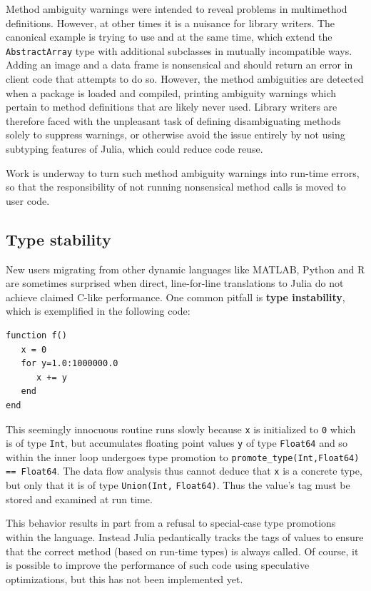 \documentclass[10pt, preprint]{sigplanconf}
\begin{document}
Method ambiguity warnings were intended to reveal problems in multimethod
definitions. However, at other times it is a nuisance for library
writers. The canonical example is trying to use  and
 at the same time, which extend the \verb|AbstractArray|
type with additional subclasses in mutually incompatible ways. Adding an image
and a data frame is nonsensical and should return an error in client code that
attempts to do so. However, the method ambiguities are detected when a package
is loaded and compiled, printing ambiguity warnings which pertain to method
definitions that are likely never used.
Library writers are therefore faced with the unpleasant task of defining
disambiguating methods solely to suppress warnings, or otherwise
avoid the issue entirely by not using subtyping features of Julia, which could
reduce code reuse.

Work is underway to turn such method ambiguity warnings into run-time errors,
so that the responsibility of not running nonsensical method calls is moved to
user code.

\subsection{Type stability}

New users migrating from other dynamic languages like MATLAB, Python and R are
sometimes surprised when direct, line-for-line translations to Julia do not
achieve claimed C-like performance.
One common pitfall is \textbf{type instability}, which is exemplified in the following
code:

\begin{lstlisting}
function f()
   x = 0
   for y=1.0:1000000.0
      x += y
   end
end
\end{lstlisting}
%
This seemingly innocuous routine runs slowly because \verb|x| is initialized to
\verb|0| which is of type \verb|Int|, but accumulates floating point values
\verb|y| of type \verb|Float64| and so within the inner loop undergoes type
promotion to \verb|promote_type(Int,Float64)| \verb|== Float64|. The data flow
analysis thus cannot deduce that \verb|x| is a concrete type, but only that it
is of type \verb|Union(Int,| \verb|Float64)|. Thus the value's tag must be
stored and examined at run time.

This behavior results in part from a refusal to special-case type promotions
within the language. Instead Julia pedantically tracks the tags of values to
ensure that the correct method (based on run-time types) is always called.
Of course, it is possible to improve the performance of such code using
speculative optimizations, but this has not been implemented yet.
\end{document}

